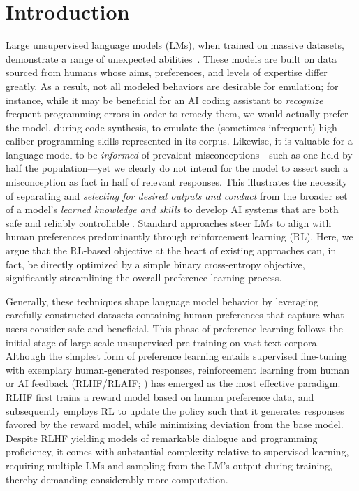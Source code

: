 \section{Introduction}
Large unsupervised language models (LMs), when trained on massive datasets, demonstrate a range of unexpected abilities~\citep{chowdhery2022palm, brown2020language, touvron2023llama,bubeck2023sparks}. These models are built on data sourced from humans whose aims, preferences, and levels of expertise differ greatly. As a result, not all modeled behaviors are desirable for emulation; for instance, while it may be beneficial for an AI coding assistant to \textit{recognize} frequent programming errors in order to remedy them, we would actually prefer the model, during code synthesis, to emulate the (sometimes infrequent) high-caliber programming skills represented in its corpus. Likewise, it is valuable for a language model to be \textit{informed} of prevalent misconceptions—such as one held by half the population—yet we clearly do not intend for the model to assert such a misconception as fact in half of relevant responses. This illustrates the necessity of separating and \emph{selecting for desired outputs and conduct} from the broader set of a model’s \textit{learned knowledge and skills} to develop AI systems that are both safe and reliably controllable \citep{ouyang2022training}. Standard approaches steer LMs to align with human preferences predominantly through reinforcement learning (RL). Here, we argue that the RL-based objective at the heart of existing approaches can, in fact, be directly optimized by a simple binary cross-entropy objective, significantly streamlining the overall preference learning process.

Generally, these techniques shape language model behavior by leveraging carefully constructed datasets containing human preferences that capture what users consider safe and beneficial. This phase of preference learning follows the initial stage of large-scale unsupervised pre-training on vast text corpora. Although the simplest form of preference learning entails supervised fine-tuning with exemplary human-generated responses, reinforcement learning from human or AI feedback (RLHF/RLAIF; \citep{christiano2017deep,bai2022constitutional}) has emerged as the most effective paradigm. RLHF first trains a reward model based on human preference data, and subsequently employs RL to update the policy such that it generates responses favored by the reward model, while minimizing deviation from the base model. Despite RLHF yielding models of remarkable dialogue and programming proficiency, it comes with substantial complexity relative to supervised learning, requiring multiple LMs and sampling from the LM’s output during training, thereby demanding considerably more computation.

